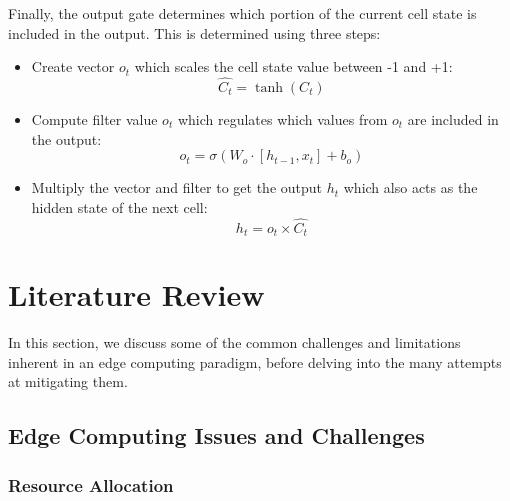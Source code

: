 Finally, the output gate determines which portion of the current cell state is included in the output. This is determined using three steps:
\begin{itemize}
    \item Create vector $o_{t}$ which scales the cell state value between -1 and +1:
    \begin{equation}
        \hat{C_{t}} = \tanh(C_{t})
    \end{equation}
    \item Compute filter value $o_{t}$ which regulates which values from $o_{t}$ are included in the output:
    \begin{equation}
        o_{t} = \sigma( W_{o}\cdot[h_{t-1}, x_{t}] + b_{o})
    \end{equation}
    \item Multiply the vector and filter to get the output $h_{t}$ which also acts as the hidden state of the next cell:
    \begin{equation}
        h_{t} = o_{t} \times \hat{C_{t}}
    \end{equation}
\end{itemize}

\section{Literature Review}
\label{sec:ch2-lit-review}

In this section, we discuss some of the common challenges and limitations inherent in an edge computing paradigm, before delving into the many attempts at mitigating them.

\subsection{Edge Computing Issues and Challenges}
\label{subsec:edge-issues}

\subsubsection{Resource Allocation}
\label{subsubsec:edge-resource-alloc}

